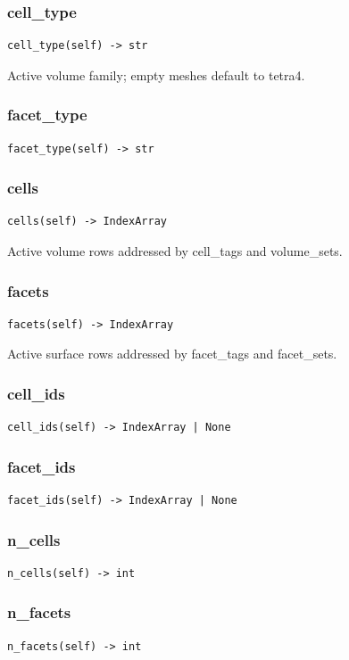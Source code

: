 \subsubsection*{cell\_type}
\begin{lstlisting}
cell_type(self) -> str
\end{lstlisting}
Active volume family; empty meshes default to tetra4.
\subsubsection*{facet\_type}
\begin{lstlisting}
facet_type(self) -> str
\end{lstlisting}
\subsubsection*{cells}
\begin{lstlisting}
cells(self) -> IndexArray
\end{lstlisting}
Active volume rows addressed by cell\_tags and volume\_sets.
\subsubsection*{facets}
\begin{lstlisting}
facets(self) -> IndexArray
\end{lstlisting}
Active surface rows addressed by facet\_tags and facet\_sets.
\subsubsection*{cell\_ids}
\begin{lstlisting}
cell_ids(self) -> IndexArray | None
\end{lstlisting}
\subsubsection*{facet\_ids}
\begin{lstlisting}
facet_ids(self) -> IndexArray | None
\end{lstlisting}
\subsubsection*{n\_cells}
\begin{lstlisting}
n_cells(self) -> int
\end{lstlisting}
\subsubsection*{n\_facets}
\begin{lstlisting}
n_facets(self) -> int
\end{lstlisting}

